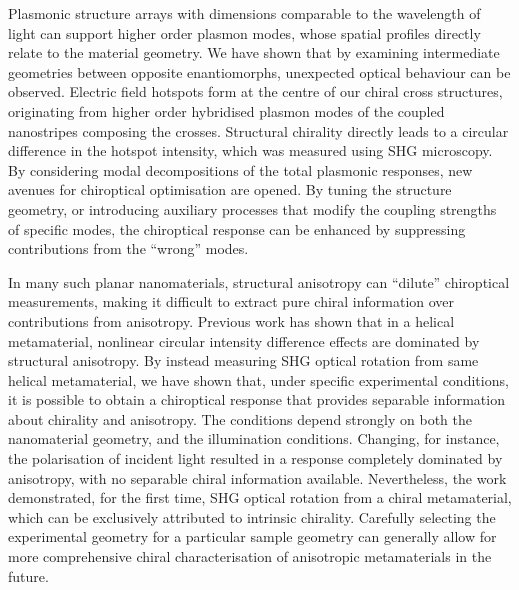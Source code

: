 Plasmonic structure arrays with dimensions comparable to the wavelength of light can support higher order plasmon modes, whose spatial profiles directly relate to the material geometry. We have shown that by examining intermediate geometries between opposite enantiomorphs, unexpected optical behaviour can be observed. Electric field hotspots form at the centre of our chiral cross structures, originating from higher order hybridised plasmon modes of the coupled nanostripes composing the crosses. Structural chirality directly leads to a circular difference in the hotspot intensity, which was measured using SHG microscopy. By considering modal decompositions of the total plasmonic responses, new avenues for chiroptical optimisation are opened. By tuning the structure geometry, or introducing auxiliary processes that modify the coupling strengths of specific modes, the chiroptical response can be enhanced by suppressing contributions from the ``wrong'' modes.

In many such planar nanomaterials, structural anisotropy can ``dilute'' chiroptical measurements, making it difficult to extract pure chiral information over contributions from anisotropy. Previous work has shown that in a helical metamaterial, nonlinear circular intensity difference effects are dominated by structural anisotropy. By instead measuring SHG optical rotation from same helical metamaterial, we have shown that, under specific experimental conditions, it is possible to obtain a chiroptical response that provides separable information about chirality and anisotropy. The conditions depend strongly on both the nanomaterial geometry, and the illumination conditions. Changing, for instance, the polarisation of incident light resulted in a response completely dominated by anisotropy, with no separable chiral information available. Nevertheless, the work demonstrated, for the first time, SHG optical rotation from a chiral metamaterial, which can be exclusively attributed to intrinsic chirality. Carefully selecting the experimental geometry for a particular sample geometry can generally allow for more comprehensive chiral characterisation of anisotropic metamaterials in the future.

